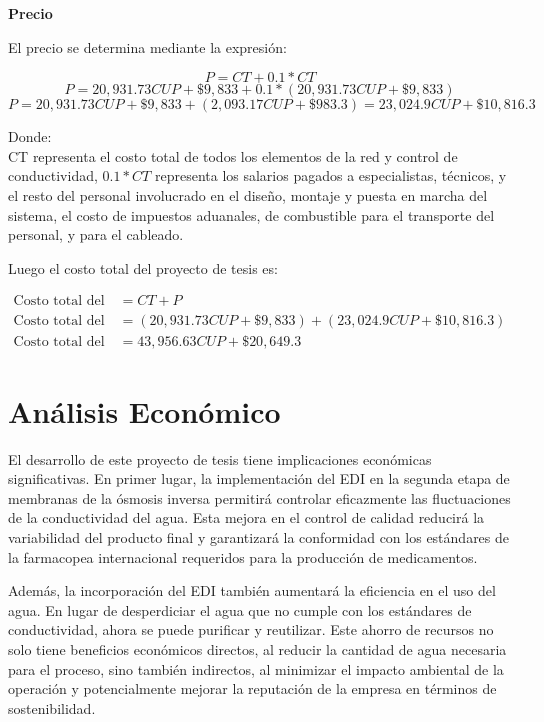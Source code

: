 \textbf{Precio}

El precio se determina mediante la expresión:

\begin{equation}
    P = CT + 0.1 * CT
\end{equation}
\begin{equation}
    P = 20,931.73 CUP + \$9, 833 + 0.1 * (20,931.73 CUP + \$9, 833)
\end{equation}
\begin{equation}
    P = 20,931.73 CUP + \$9, 833 +  (2,093.17 CUP + \$983.3) = 23,024.9 CUP + \$10,816.3
\end{equation}

Donde:\\
CT representa el costo total de todos los elementos de la red y control de conductividad, $0.1*CT$
representa los salarios pagados a especialistas, técnicos, y el resto del personal involucrado en el diseño,
montaje y puesta en marcha del sistema, el costo de impuestos aduanales, de combustible para el transporte del
personal, y para el cableado.

Luego el costo total del proyecto de tesis es:

\begin{align*}
    \text{Costo total del proyecto de tesis} & = CT + P                                                   \\
    \text{Costo total del proyecto de tesis} & = (20,931.73 CUP + \$9, 833) + (23,024.9 CUP + \$10,816.3) \\
    \text{Costo total del proyecto de tesis} & = 43,956.63 CUP+ \$20,649.3
\end{align*}


\section{Análisis Económico}

El desarrollo de este proyecto de tesis tiene implicaciones económicas significativas. En primer lugar, la implementación del EDI en la segunda etapa de membranas de la ósmosis inversa permitirá controlar eficazmente las fluctuaciones de la conductividad del agua. Esta mejora en el control de calidad reducirá la variabilidad del producto final y garantizará la conformidad con los estándares de la farmacopea internacional requeridos para la producción de medicamentos.

Además, la incorporación del EDI también aumentará la eficiencia en el uso del agua. En lugar de desperdiciar el agua que no cumple con los estándares de conductividad, ahora se puede purificar y reutilizar. Este ahorro de recursos no solo tiene beneficios económicos directos, al reducir la cantidad de agua necesaria para el proceso, sino también indirectos, al minimizar el impacto ambiental de la operación y potencialmente mejorar la reputación de la empresa en términos de sostenibilidad.


